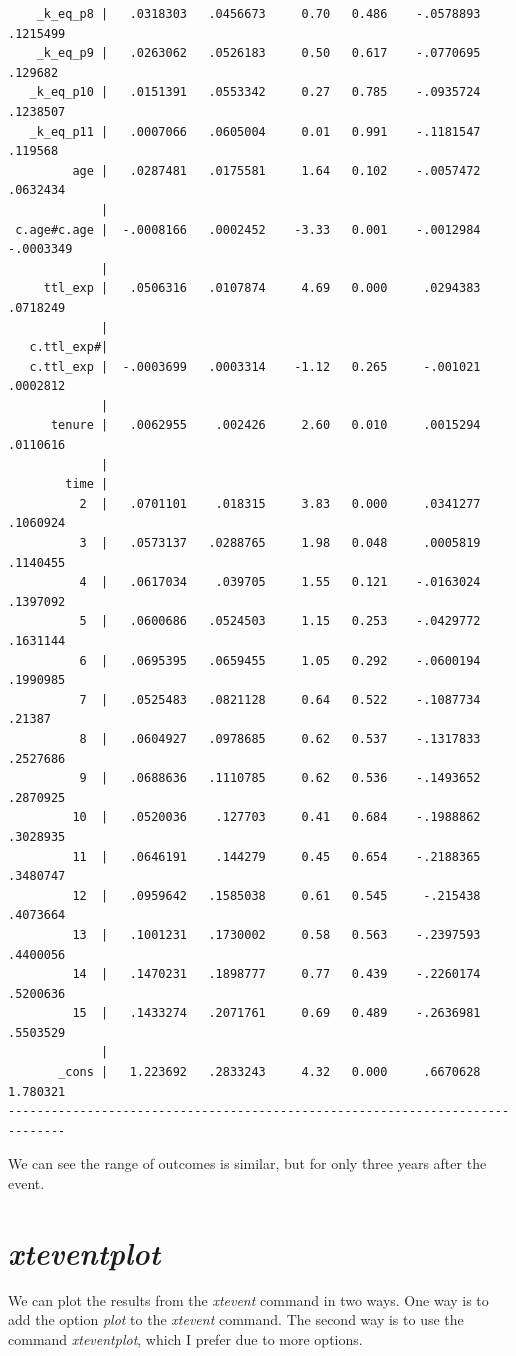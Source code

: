 \documentclass[
]{book}
\begin{document}
\begin{verbatim}
    _k_eq_p8 |   .0318303   .0456673     0.70   0.486    -.0578893    .1215499
    _k_eq_p9 |   .0263062   .0526183     0.50   0.617    -.0770695     .129682
   _k_eq_p10 |   .0151391   .0553342     0.27   0.785    -.0935724    .1238507
   _k_eq_p11 |   .0007066   .0605004     0.01   0.991    -.1181547     .119568
         age |   .0287481   .0175581     1.64   0.102    -.0057472    .0632434
             |
 c.age#c.age |  -.0008166   .0002452    -3.33   0.001    -.0012984   -.0003349
             |
     ttl_exp |   .0506316   .0107874     4.69   0.000     .0294383    .0718249
             |
   c.ttl_exp#|
   c.ttl_exp |  -.0003699   .0003314    -1.12   0.265     -.001021    .0002812
             |
      tenure |   .0062955    .002426     2.60   0.010     .0015294    .0110616
             |
        time |
          2  |   .0701101    .018315     3.83   0.000     .0341277    .1060924
          3  |   .0573137   .0288765     1.98   0.048     .0005819    .1140455
          4  |   .0617034    .039705     1.55   0.121    -.0163024    .1397092
          5  |   .0600686   .0524503     1.15   0.253    -.0429772    .1631144
          6  |   .0695395   .0659455     1.05   0.292    -.0600194    .1990985
          7  |   .0525483   .0821128     0.64   0.522    -.1087734      .21387
          8  |   .0604927   .0978685     0.62   0.537    -.1317833    .2527686
          9  |   .0688636   .1110785     0.62   0.536    -.1493652    .2870925
         10  |   .0520036    .127703     0.41   0.684    -.1988862    .3028935
         11  |   .0646191    .144279     0.45   0.654    -.2188365    .3480747
         12  |   .0959642   .1585038     0.61   0.545     -.215438    .4073664
         13  |   .1001231   .1730002     0.58   0.563    -.2397593    .4400056
         14  |   .1470231   .1898777     0.77   0.439    -.2260174    .5200636
         15  |   .1433274   .2071761     0.69   0.489    -.2636981    .5503529
             |
       _cons |   1.223692   .2833243     4.32   0.000     .6670628    1.780321
------------------------------------------------------------------------------
\end{verbatim}

We can see the range of outcomes is similar, but for only three years after the event.

\section{\texorpdfstring{\emph{xteventplot}}{xteventplot}}\label{xteventplot}

We can plot the results from the \emph{xtevent} command in two ways. One way is to add the option \emph{plot} to the \emph{xtevent} command. The second way is to use the command \emph{xteventplot}, which I prefer due to more options.
\end{document}
